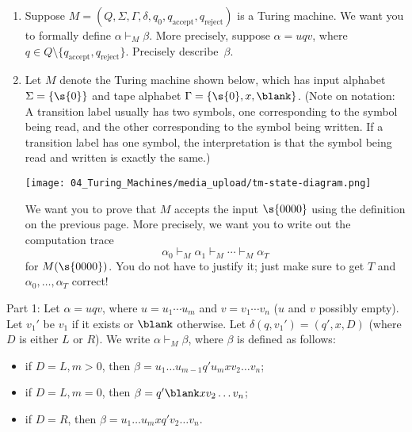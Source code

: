 \begin{flex}
\begin{exercise} \label{exercise:Practice-with-configurations} 
\begin{enumerate}
    \item Suppose $M = (Q,\Sigma, \Gamma, \delta, q_0, q_{\text{accept}}, q_{\text{reject}})$ is a Turing machine. We want you to formally define $\alpha \vdash_M \beta$. More precisely, suppose $\alpha = uqv$, where $q  \in Q \setminus \{q_{\text{accept}}, q_{\text{reject}}\}$. Precisely describe~$\beta$. 
    \item Let $M$ denote the Turing machine shown below, which has input alphabet $\Sigma = \{\s{0}\}$ and tape alphabet $\Gamma = \{\s{0},x, \blank\}$. (Note on notation: A transition label usually has two symbols, one corresponding to the symbol being read, and the other corresponding to the symbol being written. If a transition label has one symbol, the interpretation is that the symbol being read and written is exactly the same.)
    \begin{center}
        \texttt{[image: 04\_Turing\_Machines/media\_upload/tm-state-diagram.png]}   
    \end{center}
    We want you to prove that $M$ accepts the input $\s{0000}$ using the definition on the previous page.  More precisely, we want you to write out the  computation trace 
    \[
        \alpha_0 \vdash_M \alpha_1 \vdash_M \cdots \vdash_M \alpha_T
    \]
    for $M(\s{0000})$. You do not have to justify it; just make sure to get $T$ and $\alpha_0, \dots, \alpha_T$ correct!
\end{enumerate}
\end{exercise}

\begin{solution}
Part 1: Let $\alpha = uqv$, where $u = u_1\cdots u_m$ and $v =v_1\cdots v_n$ ($u$ and $v$ possibly empty). Let $v_1'$ be $v_1$ if it exists or $\blank$ otherwise. Let $\delta(q, v_1') =  (q', x, D)$ (where $D$ is either $L$ or $R$). We write $\alpha \vdash_M \beta$, where $\beta$ is defined as follows: 
\begin{itemize}
    \item if $D = L, m > 0$, then $\beta  = u_1 \ldots u_{m-1} q' u_m x v_2 \ldots v_n$;
    \item if $D = L, m = 0$, then $\beta  =  q' \blank x v_2 \ldots v_n$;
    \item if $D = R$, then $\beta = u_1 \ldots u_m x q' v_2 \ldots v_n$.
\end{itemize}


\end{solution}
\end{flex}
